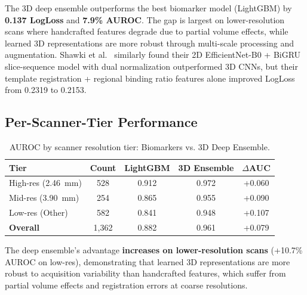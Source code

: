 The 3D deep ensemble outperforms the best biomarker model (LightGBM) by \textbf{0.137 LogLoss} and \textbf{7.9\% AUROC}. The gap is largest on lower-resolution scans where handcrafted features degrade due to partial volume effects, while learned 3D representations are more robust through multi-scale processing and augmentation. Shawki et al.~\cite{shawki2024dat} similarly found their 2D EfficientNet-B0 + BiGRU slice-sequence model with dual normalization outperformed 3D CNNs, but their template registration + regional binding ratio features alone improved LogLoss from 0.2319 to 0.2153.

\subsection{Per-Scanner-Tier Performance}
\label{sec:biomarker_scanner}

\begin{table}[H]
\centering
\caption{AUROC by scanner resolution tier: Biomarkers vs. 3D Deep Ensemble.}
\label{tab:biomarker_scanner}
\begin{tabular}{lcccc}
\toprule
\textbf{Tier} & \textbf{Count} & \textbf{LightGBM} & \textbf{3D Ensemble} & \textbf{$\Delta$AUC} \\
\midrule
High-res (2.46~mm) & 528 & 0.912 & 0.972 & +0.060 \\
Mid-res (3.90~mm) & 254 & 0.865 & 0.955 & +0.090 \\
Low-res (Other) & 582 & 0.841 & 0.948 & +0.107 \\
\midrule
\textbf{Overall} & 1,362 & 0.882 & 0.961 & +0.079 \\
\bottomrule
\end{tabular}
\end{table}

The deep ensemble's advantage \textbf{increases on lower-resolution scans} (+10.7\% AUROC on low-res), demonstrating that learned 3D representations are more robust to acquisition variability than handcrafted features, which suffer from partial volume effects and registration errors at coarse resolutions.